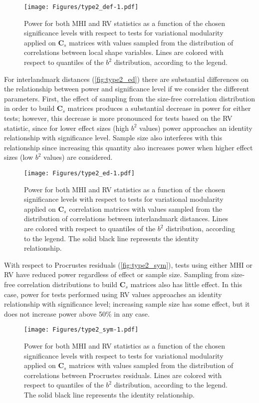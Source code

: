 \documentclass[12pt,]{article}
\begin{document}
\begin{figure}[htbp]
\centering
\texttt{[image: Figures/type2\_def-1.pdf]}
\caption{Power for both MHI and RV statistics as a function of the
chosen significance levels with respect to tests for variational
modularity applied on $\mathbf{C}_s$ matrices with values sampled from
the distribution of correlations between local shape variables. Lines
are colored with respect to quantiles of the $b^2$ distribution,
according to the legend. \label{fig:type2_def}}
\end{figure}

For interlandmark distances (\autoref{fig:type2_ed}) there are
substantial differences on the relationship between power and
significance level if we consider the different parameters. First, the
effect of sampling from the size-free correlation distribution in order
to build $\mathbf{C}_s$ matrices produces a substantial decrease in
power for either tests; however, this decrease is more pronounced for
tests based on the RV statistic, since for lower effect sizes (high
$b^2$ values) power approaches an identity relationship with
significance level. Sample size also interferes with this relationship
since increasing this quantity also increases power when higher effect
sizes (low $b^2$ values) are considered.

\begin{figure}[htbp]
\centering
\texttt{[image: Figures/type2\_ed-1.pdf]}
\caption{Power for both MHI and RV statistics as a function of the
chosen significance levels with respect to tests for variational
modularity applied on $\mathbf{C}_s$ correlation matrices with values
sampled from the distribution of correlations between interlandmark
distances. Lines are colored with respect to quantiles of the $b^2$
distribution, according to the legend. The solid black line represents
the identity relationship. \label{fig:type2_ed}}
\end{figure}

With respect to Procrustes residuals (\autoref{fig:type2_sym}), tests
using either MHI or RV have reduced power regardless of effect or sample
size. Sampling from size-free correlation distributions to build
$\mathbf{C}_s$ matrices also has little effect. In this case, power for
tests performed using RV values approaches an identity relationship with
significance level; increasing sample size has some effect, but it does
not increase power above 50\% in any case.

\begin{figure}[htbp]
\centering
\texttt{[image: Figures/type2\_sym-1.pdf]}
\caption{Power for both MHI and RV statistics as a function of the
chosen significance levels with respect to tests for variational
modularity applied on $\mathbf{C}_s$ matrices with values sampled from
the distribution of correlations between Procrustes residuals. Lines are
colored with respect to quantiles of the $b^2$ distribution, according
to the legend. The solid black line represents the identity
relationship. \label{fig:type2_sym}}
\end{figure}
\end{document}
